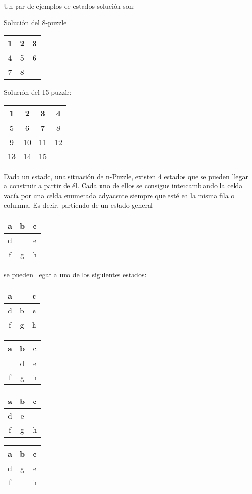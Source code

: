 \noindent Un par de ejemplos de estados solución son:

Solución del 8-puzzle:
\begin{tabular}{|c|c|c|}  \hline
1 & 2  & 3  \\   \hline
4 & 5  & 6  \\ \hline
7 & 8  &  \\  \hline
\end{tabular}
\hspace{1cm}
Solución del 15-puzzle:
\begin{tabular}{|c|c|c|c|}  \hline
1 & 2  & 3 & 4 \\  \hline 
5 & 6  & 7 & 8 \\ \hline
9 & 10  & 11 & 12 \\ \hline
13 & 14  & 15 & \\ \hline
\end{tabular}


Dado un estado, una situación de n-Puzzle, existen 4 estados que se pueden llegar a construir a partir de él. Cada uno de ellos se consigue intercambiando la celda vacía por una celda enumerada adyacente siempre que esté en la misma fila o columna.
Es decir, partiendo de un estado general
\begin{tabular}{|c|c|c|}  \hline
a & b  & c  \\   \hline
d &   & e  \\ \hline
f & g  & h  \\  \hline
\end{tabular}
se pueden llegar a uno de los siguientes estados:

\hfil\begin{tabular}{|c|c|c|}  \hline
a &    & c  \\   \hline
d & b  & e  \\ \hline
f & g  & h  \\  \hline
\end{tabular} 
\hspace{1cm}
\begin{tabular}{|c|c|c|}  \hline
a & b  & c  \\   \hline
 &  d & e  \\ \hline
f & g  & h  \\  \hline
\end{tabular}
\hspace{1cm}
\begin{tabular}{|c|c|c|}  \hline
a & b  & c  \\   \hline
d & e  &   \\ \hline
f & g  & h  \\  \hline
\end{tabular}
\hspace{1cm}
\begin{tabular}{|c|c|c|}  \hline
a & b  & c  \\   \hline
d & g  & e  \\ \hline
f &   & h  \\  \hline
\end{tabular}

